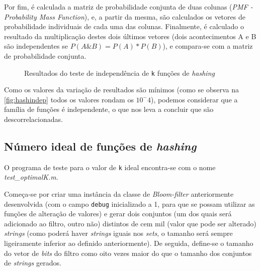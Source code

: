 \documentclass[a4paper,11pt,openright,oneside]{report}
\begin{document}
Por fim, é calculada a matriz de probabilidade conjunta de duas colunas (\textit{PMF - Probability Mass Function}), e, a partir da mesma, são calculados os vetores de probabilidade individuais de cada uma das colunas. Finalmente, é calculado o resultado da multiplicação destes dois últimos vetores (dois acontecimentos A e B são independentes se $P(A\&B) = P(A) * P(B)$), e compara-se com a matriz de probabilidade conjunta.

\begin{figure}[ht]	
\center
{}
\caption{Resultados do teste de independência de \texttt{k} funções de \textit{hashing}}
\label{fig:hashindep}
\end{figure}

Como os valores da variação de resultados são mínimos (como se observa na \autoref{fig:hashindep} todos os valores rondam os $10^-4$), podemos considerar que a família de funções é independente, o que nos leva a concluir que são descorrelacionadas.

\subsection{Número ideal de funções de \textit{hashing}}
\label{subsec.optimalk}

O programa de teste para o valor de \texttt{k} ideal encontra-se com o nome \textit{test\_optimalK.m}.

Começa-se por criar uma instância da classe de \textit{Bloom-filter} anteriormente desenvolvida (com o campo \texttt{debug} inicializado a 1, para que se possam utilizar as funções de alteração de valores) e gerar dois conjuntos (um dos quais será adicionado ao filtro, outro não) distintos de cem mil (valor que pode ser alterado) \textit{strings} (como poderá haver \textit{strings} iguais nos \textit{sets}, o tamanho será sempre ligeiramente inferior ao definido anteriormente). De seguida, define-se o tamanho do vetor de \textit{bits} do filtro como oito vezes maior do que o tamanho dos conjuntos de \textit{strings} gerados.
\end{document}
